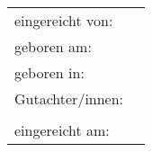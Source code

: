{\begin{titlepage}
		\vfill
{}
		{\large \raggedleft
			\begin{tabularx}{\textwidth}{l@{\,\,\raggedright~}L} %
				eingereicht von: & \@titelAutor\\
				geboren am: & {\@titelGeburtsdatum}\\
				geboren in: & \@titelGeburtsort
				\vspace{0.5\baselineskip}\\
				Gutachter/innen: & \@titelGutachterA \\
					& \@titelGutachterB
				\vspace{0.5\baselineskip}\\
				eingereicht am: & \@titelEinreichungsdatum \hfill \@titelVerteidigungsdatum
			\end{tabularx}}
			\vspace{-1\baselineskip}\\\phantom{x} %
		\setlength{\parindent}{\parindentbak}
		\setlength{\parskip}{\parskipbak}
	\end{titlepage}

	\let\@titelTitel\undefined
	\let\titel\undefined
	\let\@titelArbeit\undefined
	\let\typ\undefined
	\let\@titelGrad\undefined
	\let\grad\undefined
	\let\@titelAutor\undefined
	\let\autor\undefined
	\let\@titelGeburtsdatum\undefined
	\let\gebdatum\undefined
	\let\@titelGeburtsort\undefined
	\let\gebort\undefined
	\let\@titelGutachterA\undefined
	\let\@titelGutachterB\undefined
	\let\gutachter\undefined
	\let\@titelEinreichungsdatum\undefined
	\let\einreichungsdatum\undefined
	\let\@titelVerteidigungsdatum\undefined
	\let\verteidigungsdatum\undefined
	\let\@titelBetreuer\undefined
	\let\betreuer\undefined

	\KOMAoptions{\@wastwoside}%
	\let\@wastwoside\undefined
	\cleardoublepage %
}

